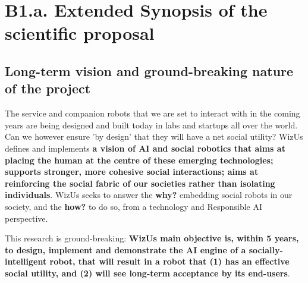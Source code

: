 \documentclass[11pt,a4paper]{report}
\newcommand{\project}{WizUs\xspace}
\newcommand{\eu}[1]{}
\begin{document}

\chapter{B1.a. Extended Synopsis of the scientific proposal}\label{part1}

\eu{(max 5 pages)}

\eu{The Extended Synopsis should give a concise presentation of the scientific
proposal, with particular attention to the ground-breaking nature of the
research project and the feasibility of the outlined scientific approach.
Describe the proposed work in the context of the state of the art of the field.
References to literature should also be included. References do not count
towards the page limits. It is important that this extended synopsis contains
all essential information including the feasibility of the scientific proposal
since the panel will only evaluate Part B1 at step 1.}

\section{Long-term vision and ground-breaking nature of the project}

The service and companion robots that we are set to interact with in the coming
years are being designed and built today in labs and startups all over the
world. Can we however ensure 'by design' that they will have a net social utility?
\project defines and implements \textbf{a vision of AI
and social robotics that aims at placing the human at the centre of these
emerging technologies; supports stronger, more cohesive social interactions;
aims at reinforcing the social fabric of our societies rather than isolating
individuals}. \project seeks to answer the \textbf{why?} embedding social robots
in our society, and the \textbf{how?} to do so, from a technology and
Responsible AI perspective.

This research is ground-breaking: \textbf{\project main objective is, within 5
years, to design, implement and demonstrate the AI engine of a
socially-intelligent robot, that will result in a robot that (1) has an
effective social utility, and (2) will see long-term acceptance by its
end-users}.
\end{document}
